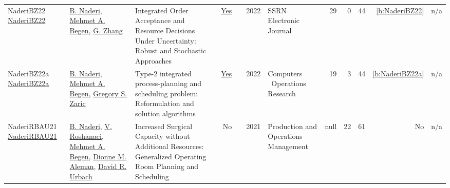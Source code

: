 {\begin{longtable}{>{\raggedright\arraybackslash}p{3cm}>{\raggedright\arraybackslash}p{6cm}>{\raggedright\arraybackslash}p{6.5cm}rrrp{2.5cm}rrrrr}
NaderiBZ22 \href{http://dx.doi.org/10.2139/ssrn.4140716}{NaderiBZ22} & \hyperref[auth:a732]{B. Naderi}, \hyperref[auth:a843]{Mehmet A. Begen}, \hyperref[auth:a844]{G. Zhang} & Integrated Order Acceptance and Resource Decisions Under Uncertainty: Robust and Stochastic Approaches & \href{../works/NaderiBZ22.pdf}{Yes} & \cite{NaderiBZ22} & 2022 & SSRN Electronic Journal & 29 & 0 & 44 & \ref{b:NaderiBZ22} & n/a\\
NaderiBZ22a \href{http://dx.doi.org/10.1016/j.cor.2022.105728}{NaderiBZ22a} & \hyperref[auth:a732]{B. Naderi}, \hyperref[auth:a843]{Mehmet A. Begen}, \hyperref[auth:a845]{Gregory S. Zaric} & Type-2 integrated process-planning and scheduling problem: Reformulation and solution algorithms & \href{../works/NaderiBZ22a.pdf}{Yes} & \cite{NaderiBZ22a} & 2022 & Computers \  Operations Research & 19 & 3 & 44 & \ref{b:NaderiBZ22a} & n/a\\
NaderiRBAU21 \href{http://dx.doi.org/10.1111/poms.13397}{NaderiRBAU21} & \hyperref[auth:a732]{B. Naderi}, \hyperref[auth:a734]{V. Roshanaei}, \hyperref[auth:a843]{Mehmet A. Begen}, \hyperref[auth:a902]{Dionne M. Aleman}, \hyperref[auth:a903]{David R. Urbach} & Increased Surgical Capacity without Additional Resources: Generalized Operating Room Planning and Scheduling & No & \cite{NaderiRBAU21} & 2021 & Production and Operations Management & null & 22 & 61 & No & n/a\\
\end{longtable}
}

\clearpage
